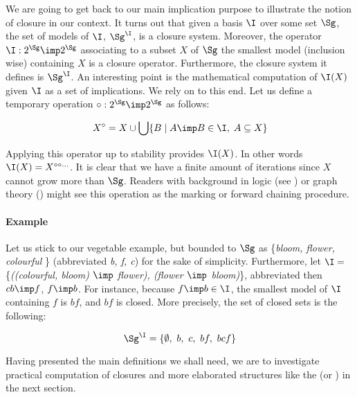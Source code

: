 \vspace{1.2em}

We are going to get back to our main implication purpose to illustrate the 
notion of closure in our context. It turns out that given a basis
$\I$ over some set $\Sg$, the set of models of $\I$, $\Sg^{\I}$, is a closure 
system. Moreover, the operator $\I : 2^{\Sg} \imp 2^{\Sg}$ associating to a 
subset $X$ of $\Sg$ the smallest model (inclusion wise) containing $X$ is 
a closure operator. Furthermore, the closure system it defines is 
$\Sg^{\I}$. An interesting point is the mathematical computation of 
$\I(X)$ given $\I$ as a set of implications. We rely on 
\cite{wild_implicational_1989, b._ganter_conceptual_2016} to this end. Let 
us define a temporary operation $\circ : 2^{\Sg} \imp 2^{\Sg}$ as follows:

\[ X^{\circ} = 
X \cup \bigcup \{ B \; | \; A \imp B \in \I, \; A \subseteq X \} \]

\noindent Applying this operator up to stability provides $\I(X)$. In other 
words $\I(X) 
= X^{\circ \circ \dots}$. It is clear that we have a finite amount of 
iterations since $X$ cannot grow more than $\Sg$. Readers with background in
logic (see \cite{boros_strong_2017}) or graph theory 
(\cite{berczi_directed_2017}) might see this operation as the marking or 
forward chaining procedure.

\vspace{1.2em}

\paragraph{Example} Let us stick to our vegetable example, but bounded to $\Sg$ as \{\textit{bloom, flower, colourful} \} (abbreviated \textit{b, f, c}) for the sake of simplicity. Furthermore, let $\I =$ \{\textit{((colourful, bloom) 
$\imp$ flower), (flower $\imp$ bloom)}\}, abbreviated then $cb \imp f$, $f 
\imp b$. For instance, because $f \imp b \in \I$, the smallest model of $\I$ 
containing $f$ is $bf$, and $bf$ is closed. More precisely, the set of closed
sets is the following:

	\[ \Sg^{\I} = \{ \emptyset, \ b, \ c, \ bf, \ bcf \} \]
	
\vspace{1.2em}

Having presented the main definitions we shall need, we are to investigate 
practical computation of closures and more elaborated structures like the 
 (or ) in the next section.




